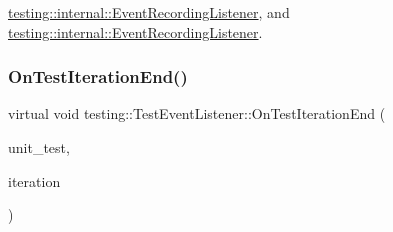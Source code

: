 \mbox{\hyperlink{classtesting_1_1internal_1_1_event_recording_listener_a48f6f53c044e8cb6425f9bc7319ddecc}{testing\+::internal\+::\+Event\+Recording\+Listener}}, and \mbox{\hyperlink{classtesting_1_1internal_1_1_event_recording_listener_ab0cc007bcfaf06cd383d574c88f62aea}{testing\+::internal\+::\+Event\+Recording\+Listener}}.

\mbox{\label{classtesting_1_1_test_event_listener_a550fdb3e55726e4cefa09f5697941425}} 
\subsubsection{\texorpdfstring{OnTestIterationEnd()}{OnTestIterationEnd()}\hspace{0.1cm}{\footnotesize\ttfamily [2/3]}}
{\footnotesize\ttfamily virtual void testing\+::\+Test\+Event\+Listener\+::\+On\+Test\+Iteration\+End (\begin{DoxyParamCaption}\item[{const \mbox{\hyperlink{classtesting_1_1_unit_test}{Unit\+Test}} \&}]{unit\+\_\+test,  }\item[{int}]{iteration }\end{DoxyParamCaption})\hspace{0.3cm}{\ttfamily [pure virtual]}}



